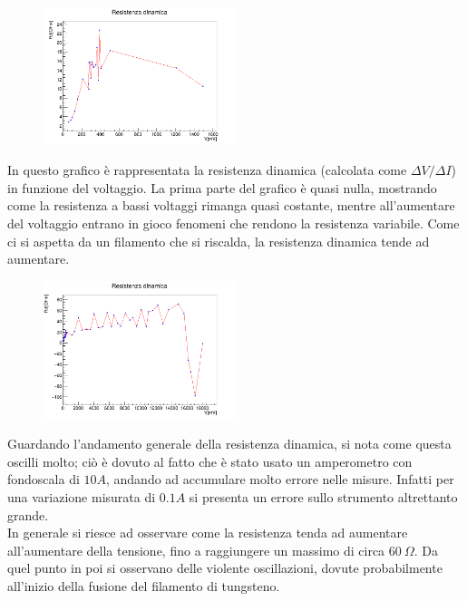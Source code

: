 \documentclass[10pt,twocolumn]{article}
\begin{document}
\begin{figure}[H] %
  \centering
  \includegraphics[width=0.5\textwidth]{curva_voltammetrica/resistenza_dinamica_zoom.png} %
  \label{fig:I_V_}
\end{figure}
 In questo grafico è rappresentata la resistenza dinamica (calcolata come $\Delta V/\Delta I$) in funzione del voltaggio. La prima parte del grafico è quasi nulla, mostrando come la resistenza a bassi voltaggi rimanga quasi costante, mentre all'aumentare del voltaggio entrano in gioco fenomeni che rendono la resistenza variabile. 
Come ci si aspetta da un filamento che si riscalda, la resistenza dinamica tende ad aumentare.
\begin{figure}[H] %
  \centering
  \includegraphics[width=0.5\textwidth]{curva_voltammetrica/resistenza_dinamica.png} %
  \label{fig:I_V_}
\end{figure}
\noindent Guardando l'andamento generale della resistenza dinamica, si nota come questa oscilli molto; ciò è dovuto al fatto che è stato usato un amperometro con fondoscala di $10 A$, andando ad accumulare molto errore nelle misure.
Infatti per una variazione misurata di $0.1 A$ si presenta un errore sullo strumento altrettanto grande.\\
In generale si riesce ad osservare come la resistenza tenda ad aumentare all'aumentare della tensione, fino a raggiungere un massimo di circa $60 \: \Omega$. 
Da quel punto in poi si osservano delle violente oscillazioni, dovute probabilmente all'inizio della fusione del filamento di tungsteno. 
\end{document}

